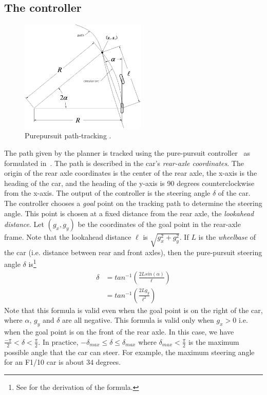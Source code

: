 \subsection{The controller}
\label{sec:ppcontroller}

\begin{figure}
\centering
\includegraphics[width=60mm]{Figures/Purepursuit.png}%
\caption{Purepursuit path-tracking \cite{Snider.2009}.}
\label{fig:purepursuit}%
\end{figure}

The path given by the planner is tracked using the pure-pursuit controller~\cite{Amidi.1991}
as formulated in~\cite{Snider.2009}.
%
The path is described in the car's \emph{rear-axle coordinates}.
%
The origin of the rear axle coordinates is the center of the rear axle, the x-axis is the heading of the car, and the heading of the y-axis is 90 degrees counterclockwise from the x-axis.
%
The output of the controller is the steering angle $\delta$ of the car.
%
The controller chooses a \emph{goal} point on the tracking path to determine the steering angle.
%
This point is chosen at a fixed distance from the rear axle, the \emph{lookahead distance}.
%
Let $(g_x, g_y)$ be the coordinates of the goal point in the rear-axle frame.
%
Note that the lookahead distance $\ell$ is $\sqrt{g_x^2+g_y^2}$.
%
If $L$ is the \emph{wheelbase} of the car (i.e. distance between rear and front axles), then the pure-pursuit steering angle $\delta$ is\footnote{See \cite{Snider.2009} for the derivation of the formula.}
\begin{align}
\delta & = tan^{-1}(\frac{2Lsin(\alpha)}{\ell}) \nonumber \\
 & =  tan^{-1}(\frac{2L g_y}{\ell^2})
 \label{eqn:purepursuit}
\end{align}
%
Note that this formula is valid even when the goal point is on the right of the car,
where $\alpha$, $g_y$ and $\delta$ are all negative.
%
This formula is valid only when $g_x > 0$
i.e. when the goal point is on the front of the rear axle.
%
In this case,
we have $\frac{-\pi}{2} < \delta < \frac{\pi}{2} $.
%
In practice,
$-\delta_{max} \leq \delta \leq \delta_{max} $
where $\delta_{max} < \frac{\pi}{2}$ is the maximum possible angle that the car can steer.
%
For example,
the maximum steering angle for an F1/10 car is about $34$ degrees.
